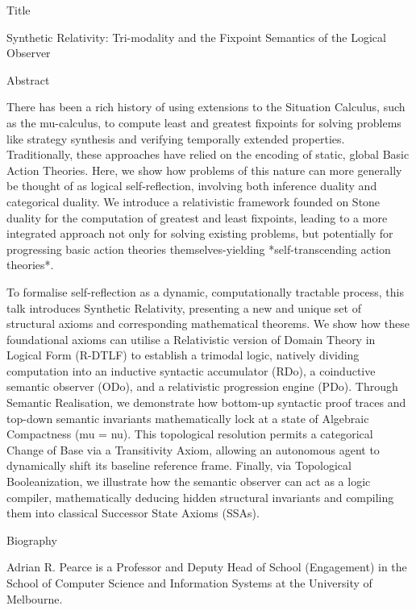 
Title

Synthetic Relativity: Tri-modality and the Fixpoint Semantics of the Logical Observer


Abstract

There has been a rich history of using extensions to the Situation Calculus, such as the mu-calculus, to compute least and greatest fixpoints for solving problems like strategy synthesis and verifying temporally extended properties. Traditionally, these approaches have relied on the encoding of static, global Basic Action Theories. Here, we show how problems of this nature can more generally be thought of as logical self-reflection, involving both inference duality and categorical duality. We introduce a relativistic framework founded on Stone duality for the computation of greatest and least fixpoints, leading to a more integrated approach not only for solving existing problems, but potentially for progressing basic action theories themselves-yielding *self-transcending action theories*.

To formalise self-reflection as a dynamic, computationally tractable process, this talk introduces Synthetic Relativity, presenting a new and unique set of structural axioms and corresponding mathematical theorems. We show how these foundational axioms can utilise a Relativistic version of Domain Theory in Logical Form (R-DTLF) to establish a trimodal logic, natively dividing computation into an inductive syntactic accumulator (RDo), a coinductive semantic observer (ODo), and a relativistic progression engine (PDo). Through Semantic Realisation, we demonstrate how bottom-up syntactic proof traces and top-down semantic invariants mathematically lock at a state of Algebraic Compactness (mu = nu). This topological resolution permits a categorical Change of Base via a Transitivity Axiom, allowing an autonomous agent to dynamically shift its baseline reference frame. Finally, via Topological Booleanization, we illustrate how the semantic observer can act as a logic compiler, mathematically deducing hidden structural invariants and compiling them into classical Successor State Axioms (SSAs).

Biography 

Adrian R. Pearce is a Professor and Deputy Head of School (Engagement) in the School of Computer Science and Information Systems at the University of Melbourne. 

